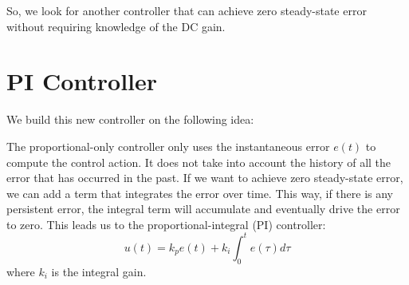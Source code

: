 \documentclass{ee122_notes}
\begin{document}
So, we look for another controller that can achieve zero steady-state error without requiring knowledge of the DC gain. 

\section{PI Controller}
We build this new controller on the following idea:

The proportional-only controller only uses the instantaneous error $e(t)$ to compute the control action. It does not take into account the history of all the error that has occurred in the past. If we want to achieve zero steady-state error, we can add a term that integrates the error over time. This way, if there is any persistent error, the integral term will accumulate and eventually drive the error to zero. This leads us to the proportional-integral (PI) controller:
\[
    u(t) = k_p e(t) + k_i \int_0^t e(\tau) d\tau
\]
where $k_i$ is the integral gain. 
\end{document}
